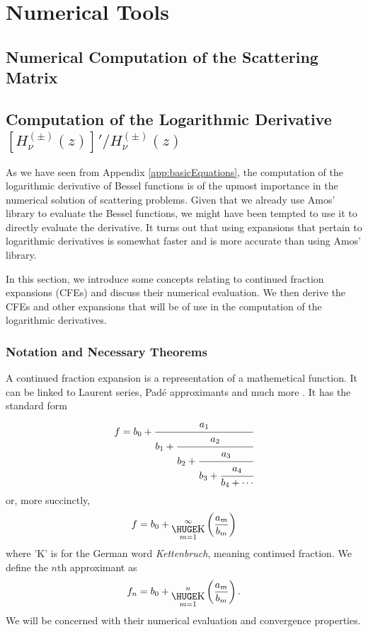 \chapter{Numerical Tools}

\section{Numerical Computation of the Scattering Matrix}\label{sec:app.numTools.scatMat}

\section{Computation of the Logarithmic Derivative $[H^{(\pm)}_\nu(z)]'/H^{(\pm)}_\nu(z)$}\label{sec:app.numTools.logDeriv}

As we have seen from Appendix \ref{app:basicEquations}, the computation of the logarithmic derivative
of Bessel functions is of the upmost importance in the numerical solution 
of scattering problems. Given that we already use Amos' library to evaluate
the Bessel functions, we might have been tempted to use it 
to directly evaluate the derivative. It turns out that using
expansions that pertain to logarithmic derivatives is somewhat
faster and is more accurate than using Amos' library. 

In this section, we introduce some concepts relating to 
continued fraction expansions (CFEs) and discuss their numerical
evaluation. We then derive the CFEs and other expansions that will
be of use in the computation of the logarithmic derivatives.

\subsection{Notation and Necessary Theorems}
A continued fraction expansion is a representation
of a mathemetical function. It can be linked to 
Laurent series, Padé approximants and much more 
\cite{CUY2008}. It has the standard form 
  \begin{equation}
    f = b_0+\cfrac{a_1}{b_1+\cfrac{a_2}{b_2+\cfrac{a_3}{b_3+\cfrac{a_4}{b_4+\cdots}}}}
  \end{equation}
or, more succinctly, 
  \begin{equation}
   f = b_0 + \bigk_{m=1}^\infty\left(\frac{a_m}{b_m}\right)
  \end{equation}
where 'K' is for the German word \textit{Kettenbruch}, meaning continued fraction.
We define the $n$th approximant as
  \begin{equation}
   f_n = b_0 + \bigk_{m=1}^n\left(\frac{a_m}{b_m}\right).
  \end{equation}
We will be concerned with their numerical evaluation and convergence properties.

